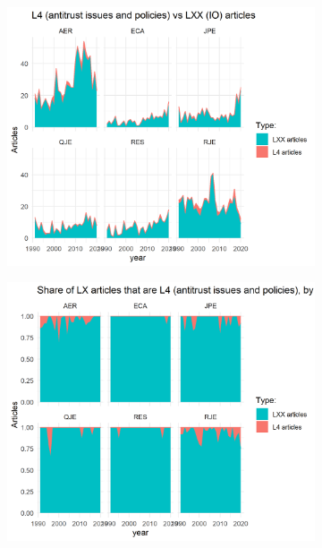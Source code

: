 \documentclass[11pt, letterpaper, twoside]{article}
\begin{document}
\begin{figure}
    \begin{subfigure}[!htbp]{0.49\textwidth}
        \centering
        \includegraphics[width=\textwidth]{L4-vs-LXX-by-journal.png}
    \end{subfigure}
    \hfill
    \begin{subfigure}[!htbp]{0.49\textwidth}
        \centering
        \includegraphics[width=\textwidth]{L4-vs-LXX-normalized-by_journal.png}
    \end{subfigure}
\end{figure}
\end{document}
